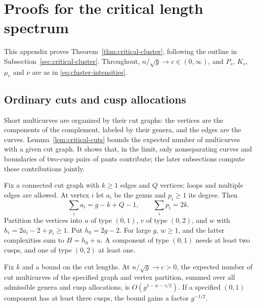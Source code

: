 \section{Proofs for the critical length spectrum}\label{app:critical}

This appendix proves Theorem~\ref{thm:critical-cluster}, following the
outline in Subsection~\ref{sec:critical-cluster}. Throughout,
$n/\sqrt g\to c\in(0,\infty)$, and $P_s$, $K_s$, $\mu_c$ and $\nu$ are as
in \eqref{eq:cluster-intensities}.

\subsection{Ordinary cuts and cusp allocations}

Short multicurves are organized by their cut graphs: the vertices are the
components of the complement, labeled by their genera, and the edges are
the curves. Lemma~\ref{lem:critical-cuts} bounds the expected number of
multicurves with a given cut graph. It shows that, in the limit, only
nonseparating curves and boundaries of two-cusp pairs of pants
contribute; the later subsections compute these contributions jointly.

Fix a connected cut graph with $k\ge1$ edges and $Q$ vertices;
loops and multiple edges are allowed. At vertex $i$ let $a_i$ be the
genus and $p_i\ge1$ its degree. Then
\[
 \sum_i a_i=g-k+Q-1,\qquad \sum_i p_i=2k.
\]
Partition the vertices into $u$ of type $(0,1)$, $v$ of type $(0,2)$,
and $w$ with $h_i=2a_i-2+p_i\ge1$. Put $h_0=2g-2$. For large
$g$, $w\ge1$, and the latter complexities sum to $H=h_0+u$.
A component of type $(0,1)$ needs at least two cusps, and one of
type $(0,2)$ at least one.

\begin{lemma}\label{lem:critical-cuts}
Fix $k$ and a bound on the cut lengths. At $n/\sqrt g\to c>0$,
the expected number of cut multicurves of the specified graph and
vertex partition, summed over all admissible genera and cusp allocations,
is $O(g^{1-w-v/2})$. If a specified $(0,1)$ component has at least
three cusps, the bound gains a factor $g^{-1/2}$.
\end{lemma}

